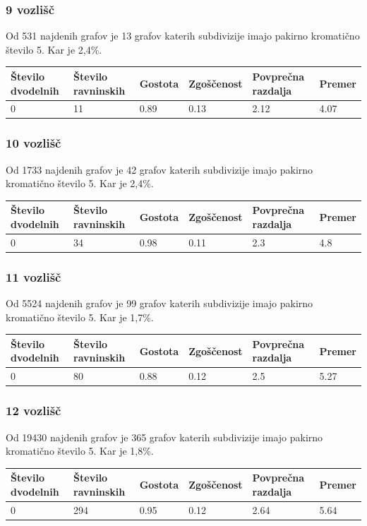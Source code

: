 \documentclass[11pt,a4paper,titlepage]{article}
\begin{document}
\subsubsection{9 vozlišč}
Od 531 najdenih grafov je 13 grafov katerih subdivizije imajo pakirno kromatično število 5. Kar je 2,4\%.  
\begin{table}[H]
	\begin{tabular}{|l|l|l|l|l|l|}
		\hline
		Število dvodelnih	& Število ravninskih  & Gostota  & Zgoščenost & Povprečna razdalja & Premer \\ \hline
		0 & 11  & 0.89 & 0.13 & 2.12 & 4.07 \\ \hline
	\end{tabular}
\end{table}

\subsubsection{10 vozlišč}
Od 1733 najdenih grafov je 42 grafov katerih subdivizije imajo pakirno kromatično število 5. Kar je 2,4\%.
\begin{table}[H]
	\begin{tabular}{|l|l|l|l|l|l|}
		\hline
		Število dvodelnih	& Število ravninskih  & Gostota  & Zgoščenost & Povprečna razdalja & Premer \\ \hline
		0 & 34  & 0.98 & 0.11 & 2.3 & 4.8 \\ \hline
	\end{tabular}
\end{table}

\subsubsection{11 vozlišč}
Od 5524 najdenih grafov je 99 grafov katerih subdivizije imajo pakirno kromatično število 5. Kar je 1,7\%. 
\begin{table}[H]
	\begin{tabular}{|l|l|l|l|l|l|}
		\hline
		Število dvodelnih	& Število ravninskih  & Gostota  & Zgoščenost & Povprečna razdalja & Premer \\ \hline
		0 & 80  & 0.88 & 0.12 & 2.5 & 5.27 \\ \hline
	\end{tabular}
\end{table}

\subsubsection{12 vozlišč}
Od 19430 najdenih grafov je 365 grafov katerih subdivizije imajo pakirno kromatično število 5. Kar je 1,8\%. 
\begin{table}[H]
	\begin{tabular}{|l|l|l|l|l|l|}
		\hline
		Število dvodelnih	& Število ravninskih  & Gostota  & Zgoščenost & Povprečna razdalja & Premer \\ \hline
		0 & 294  & 0.95 & 0.12 & 2.64 & 5.64 \\ \hline
	\end{tabular}
\end{table}
\end{document}
